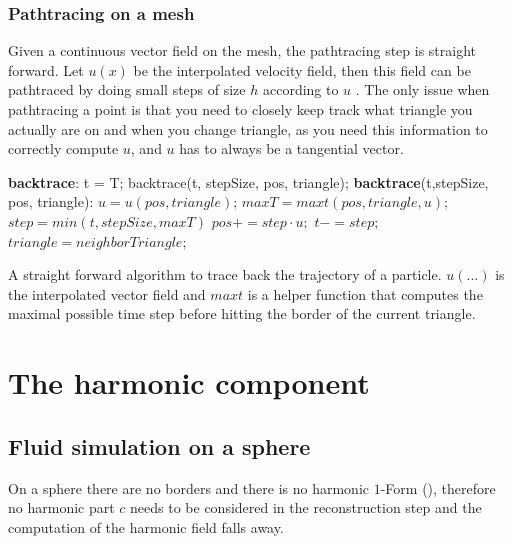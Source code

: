 
\subsubsection{Pathtracing on a mesh}
Given a continuous vector field on the mesh, the pathtracing step is straight forward. Let $u(x)$ be the interpolated velocity field, then this field can be pathtraced by doing small steps of size $h$ according to $u$ . The only issue when pathtracing a point is that you need to closely keep track what triangle you actually are on and when you change triangle, as you need this information to correctly compute $u$, and $u$ has to always be a tangential vector.

\begin{listing}
\begin{algorithmic} %
\STATE \hspace{-0.3cm}\textbf{backtrace}:
\STATE t = T;
\STATE backtrace(t, stepSize, pos, triangle);
\ENDWHILE
\STATE
\STATE \hspace{-0.3cm}\textbf{backtrace}(t,stepSize, pos, triangle):
\STATE $u = u(pos, triangle)$;
\STATE $maxT = maxt(pos, triangle, u)$;
\STATE $step = min(t, stepSize, maxT)$
\STATE $pos += step \cdot u;$
\STATE $t-= step;$
\ENDIF
{}
\STATE $triangle = neighborTriangle$; %
\ENDIF
\end{algorithmic}
\caption{A straight forward algorithm to trace back the trajectory of a particle. $u(...)$ is the interpolated vector field and $maxt$ is a helper function that computes the maximal possible time step before hitting the border of the current triangle.}
\end{listing}

\section{The harmonic component} 

\subsection{Fluid simulation on a sphere}
On a sphere there are no borders and there is no harmonic $1$-Form (), therefore no harmonic part $c$ needs to be considered in the reconstruction step and the computation of the harmonic field falls away.

